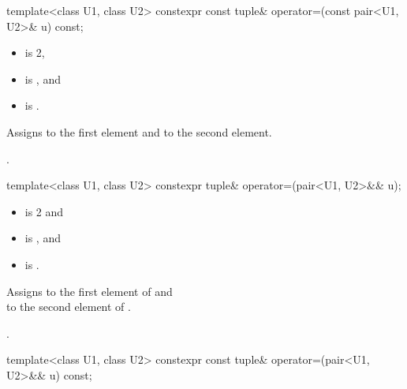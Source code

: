 \documentclass{wg21}
\begin{document}
%
\begin{itemdecl}
    template<class U1, class U2> constexpr const tuple& operator=(const pair<U1, U2>& u) const;
\end{itemdecl}

\begin{itemdescr}
    \pnum
    \constraints
    \begin{itemize}
        \item
         is 2,
        \item
         is , and
        \item
         is .
    \end{itemize}

    \pnum
    \effects
    Assigns  to the first element and
     to the second element.

    \pnum
    \returns
    .
\end{itemdescr}

%
%
\begin{itemdecl}
    template<class U1, class U2> constexpr tuple& operator=(pair<U1, U2>&& u);
\end{itemdecl}

\begin{itemdescr}
    \pnum
    \constraints
    \begin{itemize}
        \item {} is 2 and
        \item {} is , and
        \item {} is .
    \end{itemize}

    \pnum
    \effects
    Assigns  to the first
    element of  and\\  to the
    second element of .

    \pnum
    \returns
    .
\end{itemdescr}

%
\begin{itemdecl}
    template<class U1, class U2> constexpr const tuple& operator=(pair<U1, U2>&& u) const;
\end{itemdecl}
\end{document}
